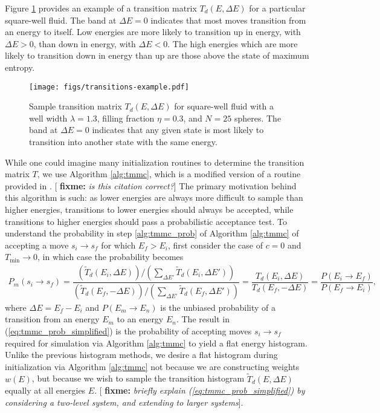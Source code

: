 \documentclass[11pt]{article}
\renewcommand{\t}{\text} %
\newcommand{\f}[2]{\dfrac{#1}{#2}} %
\newcommand{\p}[1]{\left(#1\right)} %
\newcommand{\red}[1]{{\bf \color{red} #1}}
\newcommand{\fixme}[1]{[\red{fixme:} \emph{#1}]}
\begin{document}
Figure \ref{fig:transitions_sample} provides an example of a
transition matrix $T_d\p{E,\Delta E}$ for a particular square-well
fluid. The band at $\Delta E=0$ indicates that most moves transition
from an energy to itself. Low energies are more likely to transition
up in energy, with $\Delta E>0$, than down in energy, with $\Delta
E<0$. The high energies which are more likely to transition down in
energy than up are those above the state of maximum entropy.

\begin{figure}
  \centering
  \texttt{[image: figs/transitions-example.pdf]}
  \caption[Transition matrix]
  {Sample transition matrix $T_d\p{E,\Delta E}$ for square-well fluid
    with a well width $\lambda=1.3$, filling fraction $\eta=0.3$, and
    $N=25$ spheres.  The band at $\Delta E=0$ indicates that any given
    state is most likely to transition into another state with the
    same energy.}
  \label{fig:transitions_sample}
\end{figure}

While one could imagine many initialization routines to determine the
transition matrix $T$, we use Algorithm \ref{alg:tmmc}, which is a
modified version of a routine provided in \cite{tmmc_prl}. \fixme{is
  this citation correct?} The primary motivation behind this algorithm
is such: as lower energies are always more difficult to sample than
higher energies, transitions to lower energies should always be
accepted, while transitions to higher energies should pass a
probabilistic acceptance test. To understand the probability in step
\ref{alg:tmmc_prob} of Algorithm \ref{alg:tmmc} of accepting a move
$s_i\to s_f$ for which $E_f>E_i$, first consider the case of $c=0$ and
$T_{\t{min}}\to0$, in which case the probability becomes
\begin{align}
  P_m\p{s_i\to s_f}=\f{\p{\tilde T_d\p{E_i,\Delta E}}\big/
    \p{\sum_{\Delta E'}\tilde T_d\p{E_i,\Delta E'}}} {\p{\tilde
      T_d\p{E_f,-\Delta E}}\big/ \p{\sum_{\Delta E'}\tilde
      T_d\p{E_f,\Delta E'}}} =\f{T_d\p{E_i,\Delta
      E}}{T_d\p{E_f,-\Delta E}} =\f{P\p{E_i\to E_f}}{P\p{E_f\to E_i}},
  \label{eq:tmmc_prob_simplified}
\end{align}
where $\Delta E=E_f-E_i$ and $P\p{E_m\to E_n}$ is the unbiased
probability of a transition from an energy $E_m$ to an energy
$E_n$. The result in (\ref{eq:tmmc_prob_simplified}) is the
probability of accepting moves $s_i\to s_f$ required for simulation
via Algorithm \ref{alg:tmmc} to yield a flat energy
histogram\cite{tmmc}. Unlike the previous histogram methods, we desire
a flat histogram during initialization via Algorithm \ref{alg:tmmc}
not because we are constructing weights $w\p{E}$, but because we wish
to sample the transition histogram $\tilde T_d\p{E,\Delta E}$ equally
at all energies $E$. \fixme{briefly explain
  (\ref{eq:tmmc_prob_simplified}) by considering a two-level system,
  and extending to larger systems}.
\end{document}
